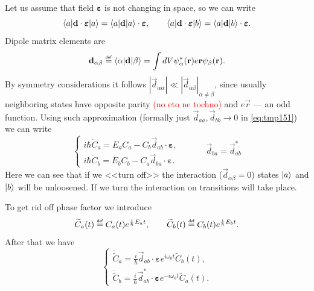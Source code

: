 Let us assume that field $\bm{\varepsilon}$ is not changing in space, so we can write
\begin{equation}
	\langle a\rvert \mathbf{d} \cdot \bm{\varepsilon} \lvert a\rangle = \langle a\rvert \mathbf{d} \lvert a\rangle \cdot \bm{\varepsilon}, \qquad 
	\langle a\rvert \mathbf{d} \cdot \bm{\varepsilon} \lvert b\rangle = \langle a\rvert \mathbf{d} \lvert b\rangle \cdot \bm{\varepsilon}.
\end{equation}
Dipole matrix elements are
\begin{equation}
	\vec{d}_{\alpha \beta} \myeq \bra{\alpha} \vec{d} \ket{\beta} = \int dV \psi_{\alpha}^* (\vec{r}) e \vec{r} \psi_{\beta} (\vec{r}).
\end{equation}
By symmetry considerations it follows  $\left| \vec{d}_{\alpha \alpha} \right| \ll \left| \vec{d}_{\alpha \beta} \right|_{\alpha \neq \beta}$, since usually neighboring states have opposite parity \textcolor{red}{(no eto ne tochno)} and $e \vec{r}$ --- an odd function. Using such approximation (formally just $\vec{d}_{aa}, \vec{d}_{bb} \to 0$ in \eqref{eq:tmp151}) we can write
\begin{equation}
	\begin{cases}
		i \hbar \dot{C}_a = E_a C_a - C_b \vec{d}_{ab} \cdot \bm{\varepsilon}, \\
		i \hbar \dot{C}_b = E_b C_b - C_a \vec{d}_{ba} \cdot \bm{\varepsilon}.
	\end{cases} 
	\qquad \quad \vec{d}_{ba} = \vec{d}_{ab}^*
\end{equation}
Here we can see that if we <<turn off>> the interaction ($\vec{d}_{\alpha \beta} = 0$) states $\lvert a\rangle$ and $\lvert b\rangle$ will be unloosened. If we turn the interaction on transitions will take place. 

To get rid off phase factor we introduce
\begin{equation}
	\widetilde{C}_a (t) \myeq C_a(t) e^{\frac{i}{\hbar}E_a t}, \qquad \widetilde{C}_b (t) \myeq C_b(t) e^{\frac{i}{\hbar}E_bt}.
\end{equation}
After that we have
\begin{equation}
	\begin{cases}
		\dot{\widetilde{C}}_a = \frac{i}{\hbar}\vec{d}_{ab} \cdot \bm{\varepsilon} e^{i \omega_0 t} \widetilde{C}_b(t), \\
		\dot{\widetilde{C}}_b = \frac{i}{\hbar}\vec{d}^*_{ab} \cdot \bm{\varepsilon} e^{-i \omega_0 t} \widetilde{C}_a(t).
	\end{cases} 
\end{equation}

